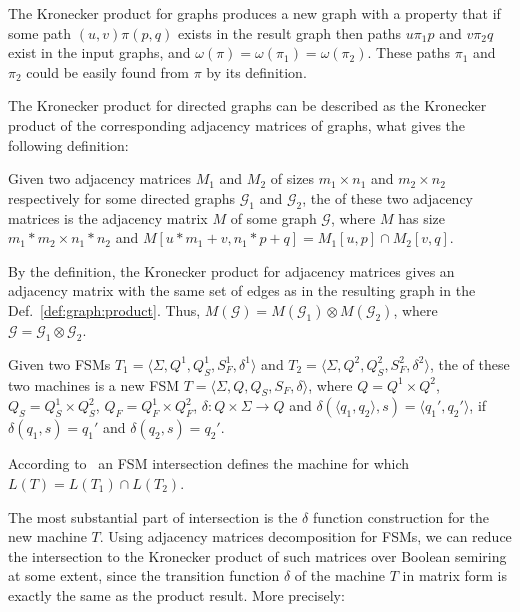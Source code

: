 The Kronecker product for graphs produces a new graph with a property
that if some path $(u,v)\pi(p,q)$ exists in the result graph
then paths $u\pi_1p$ and $v\pi_2q$ exist in the input graphs,
and $\omega(\pi) = \omega(\pi_1) = \omega(\pi_2)$.
These paths $\pi_1$ and $\pi_2$ could be easily found from $\pi$ by its definition.

The Kronecker product for directed graphs can be described as
the Kronecker product of the corresponding adjacency matrices of graphs,
what gives the following definition:

\begin{definition}
Given two adjacency matrices $M_1$ and $M_2$ of sizes
$m_1 \times n_1$ and $m_2 \times n_2$ respectively
for some directed graphs $\mathcal{G}_1$ and $\mathcal{G}_2$,
the  of these two adjacency matrices is the adjacency matrix $M$
of some graph $\mathcal{G}$, where $M$ has size $m_1 * m_2 \times n_1 * n_2$ and $M[u * m_1 + v,n_1 * p + q] = M_1[u,p] \cap M_2[v,q]$.
\end{definition}

By the definition, the Kronecker product for adjacency matrices gives an
adjacency matrix with the same set of edges as in the resulting graph in the
Def.~\ref{def:graph:product}. Thus, $M(\mathcal{G}) = M(\mathcal{G}_1) \otimes
M(\mathcal{G}_2)$, where $\mathcal{G} = \mathcal{G}_1 \otimes \mathcal{G}_2$.

\begin{definition}
\label{def:fsm:intersection}
Given two FSMs $T_1 = \langle \Sigma, Q^1, Q_S^1, S_F^1, \delta^1 \rangle$
and $T_2 = \langle \Sigma, Q^2, Q_S^2, S_F^2, \delta^2 \rangle$, the  of these two machines is a new FSM
$T = \langle \Sigma, Q, Q_S, S_F, \delta \rangle$, where $Q = Q^1 \times Q^2$, $Q_S = Q_S^1 \times Q_S^2$, $Q_F = Q_F^1 \times Q_F^2$, $\delta: Q \times \Sigma \to Q$ and $\delta (\langle q_1, q_2 \rangle, s) = \langle q_1', q_2' \rangle$, if $\delta(q_1,s)=q_1'$ and $\delta(q_2,s)=q_2'$.
\end{definition}

According to~\cite{automata:theory:10.5555/1177300} an FSM intersection defines the machine for which $L(T) = L(T_1) \cap L(T_2)$.

The most substantial part of intersection is the $\delta$ function construction for the new machine $T$.
Using adjacency matrices decomposition for FSMs, we can reduce the intersection to the Kronecker product of such matrices over Boolean semiring at some extent, since the transition function $\delta$ of the machine $T$ in matrix form is exactly the same as the product result.
More precisely:

